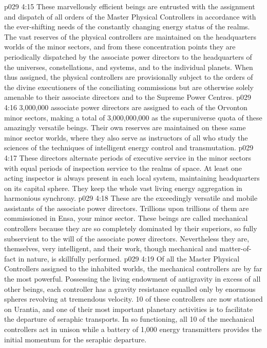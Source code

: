 \vs p029 4:15 \bibnobreakspace {} These marvellously efficient beings are entrusted with the assignment and dispatch of all orders of the Master Physical Controllers in accordance with the ever\hyp{}shifting needs of the constantly changing energy status of the realms. The vast reserves of the physical controllers are maintained on the headquarters worlds of the minor sectors, and from these concentration points they are periodically dispatched by the associate power directors to the headquarters of the universes, constellations, and systems, and to the individual planets. When thus assigned, the physical controllers are provisionally subject to the orders of the divine executioners of the conciliating commissions but are otherwise solely amenable to their associate directors and to the Supreme Power Centres.
\vs p029 4:16 3,000,000 associate power directors are assigned to each of the Orvonton minor sectors, making a total of 3,000,000,000 as the superuniverse quota of these amazingly versatile beings. Their own reserves are maintained on these same minor sector worlds, where they also serve as instructors of all who study the sciences of the techniques of intelligent energy control and transmutation.
\vs p029 4:17 These directors alternate periods of executive service in the minor sectors with equal periods of inspection service to the realms of space. At least one acting inspector is always present in each local system, maintaining headquarters on its capital sphere. They keep the whole vast living energy aggregation in harmonious synchrony.
\vs p029 4:18 \bibnobreakspace {} These are the exceedingly versatile and mobile assistants of the associate power directors. Trillions upon trillions of them are commissioned in Ensa, your minor sector. These beings are called mechanical controllers because they are so completely dominated by their superiors, so fully subservient to the will of the associate power directors. Nevertheless they are, themselves, very intelligent, and their work, though mechanical and matter\hyp{}of\hyp{}fact in nature, is skillfully performed.
\vs p029 4:19 Of all the Master Physical Controllers assigned to the inhabited worlds, the mechanical controllers are by far the most powerful. Possessing the living endowment of antigravity in excess of all other beings, each controller has a gravity resistance equalled only by enormous spheres revolving at tremendous velocity. 10 of these controllers are now stationed on Urantia, and one of their most important planetary activities is to facilitate the departure of seraphic transports. In so functioning, all 10 of the mechanical controllers act in unison while a battery of 1,000 energy transmitters provides the initial momentum for the seraphic departure.
